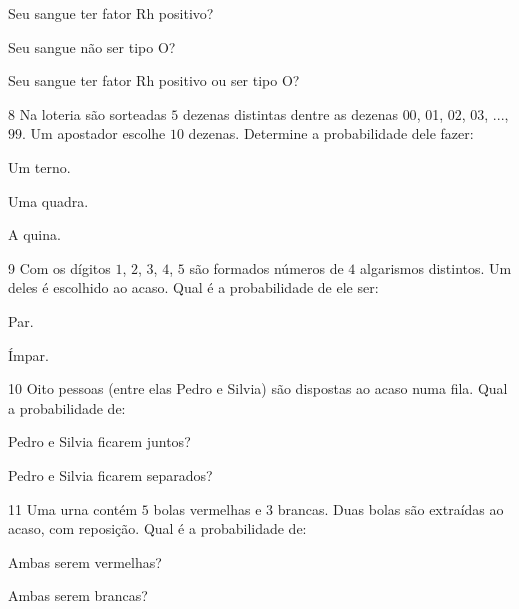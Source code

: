 \begin{escolha}
\item Seu sangue ter fator Rh positivo? 
\item Seu sangue não ser tipo O? 
\item Seu sangue ter fator Rh positivo ou ser tipo O? 
\end{escolha}

\num{8}  Na loteria são sorteadas $5$ dezenas distintas dentre as dezenas $00$,
01, $02$, $03$, ..., $99$. Um apostador escolhe $10$ dezenas. Determine a
probabilidade dele fazer:

\begin{escolha}
\item Um terno. 
\item Uma quadra. 
\item A quina. 
\end{escolha}

\num{9}  Com os dígitos $1$, $2$, $3$, $4$, $5$ são formados números de $4$ algarismos
distintos. Um deles é escolhido ao acaso. Qual é a probabilidade de ele
ser:

\begin{escolha}
\item Par. 
\item Ímpar. 
\end{escolha}

\num{10} Oito pessoas (entre elas Pedro e Silvia) são dispostas ao acaso numa
fila. Qual a probabilidade de:

\begin{escolha}
\item Pedro e Silvia ficarem juntos? 
\item Pedro e Silvia ficarem separados? 
\end{escolha}

\num{11} Uma urna contém $5$ bolas vermelhas e $3$ brancas. Duas bolas são
extraídas ao acaso, com reposição. Qual é a probabilidade de:

\begin{escolha}
\item Ambas serem vermelhas? 
\item Ambas serem brancas? 
\end{escolha}

